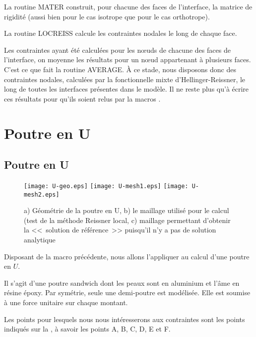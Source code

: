 \medskip
La routine MATER construit, pour chacune des faces de l'interface, la matrice de rigidité (aussi bien pour le cas isotrope
que pour le cas orthotrope).

\medskip
La routine LOCREISS calcule les contraintes nodales le long de chaque face.

\medskip
Les contraintes ayant été calculées pour les nœuds de chacune des faces de l'interface, on moyenne les résultats
pour un nœud appartenant à plusieurs faces. C'est ce que fait la routine AVERAGE. À ce stade, nous disposons donc
des contraintes nodales, calculées par la fonctionnelle mixte d'Hellinger-Reissner,
le long de toutes les interfaces présentes dans le modèle. Il ne reste plus qu'à écrire ces résultats pour qu'ils soient relus par la 
macros \ansys.










\medskip
\ifVersionAvecExemplesSepares
   \section{Poutre en U}
\else
   \subsection{Poutre en U}
\fi

\begin{figure}[ht]
   \texttt{[image: U-geo.eps]} \hfill
   \texttt{[image: U-mesh1.eps]}\hfill
   \texttt{[image: U-mesh2.eps]}
   \caption{\label{Fig-poutU-geo} a) Géométrie de la poutre en U, b) le maillage utilisé pour le calcul (test de la méthode Reissner local,
c) maillage permettant d'obtenir la <<~solution de référence~>> puisqu'il n'y a pas de solution analytique}
\end{figure}

Disposant de la macro précédente, nous allons l'appliquer au calcul d'une poutre en $U$.

Il s'agit d'une poutre sandwich dont les peaux sont en aluminium et l'âme en résine époxy.
Par symétrie, seule une demi-poutre est modélisée. Elle est soumise à une force unitaire
sur chaque montant.

\medskip
Les points pour lesquels nous nous intéresserons aux contraintes sont les points indiqués sur la
, à savoir les points A, B, C, D, E et F.



